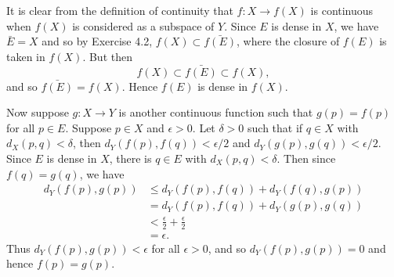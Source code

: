 \begin{ex}
It is clear from the definition of continuity that $f: X \to f(X)$ is continuous when $f(X)$ is considered as a subspace of $Y$. Since $E$ is dense in $X$, we have $\bar{E} = X$ and so by Exercise 4.2, $f(X) \subset \bar{f(E)}$, where the closure of $f(E)$ is taken in $f(X)$. But then \[f(X) \subset \bar{f(E)} \subset f(X),\] and so $\bar{f(E)} = f(X)$. Hence $f(E)$ is dense in $f(X)$.

Now suppose $g: X \to Y$ is another continuous function such that $g(p) = f(p)$ for all $p \in E$. Suppose $p \in X$ and $\epsilon > 0$. Let $\delta > 0$ such that if $q \in X$ with $d_X(p, q) < \delta$, then $d_Y(f(p), f(q)) < \epsilon/2$ and $d_Y(g(p), g(q)) < \epsilon/2$. Since $E$ is dense in $X$, there is $q \in E$ with $d_X(p, q) < \delta$. Then since $f(q) = g(q)$, we have
\begin{align*}
d_Y(f(p), g(p)) & \leq d_Y(f(p), f(q)) + d_Y(f(q), g(p))\\
& = d_Y(f(p), f(q)) + d_Y(g(p), g(q))\\
& < \frac{\epsilon}{2} + \frac{\epsilon}{2}\\
& = \epsilon.
\end{align*}
Thus $d_Y(f(p), g(p)) < \epsilon$ for all $\epsilon > 0$, and so $d_Y(f(p), g(p)) = 0$ and hence $f(p) = g(p)$.
\end{ex}

\begin{ex}

\end{ex}

